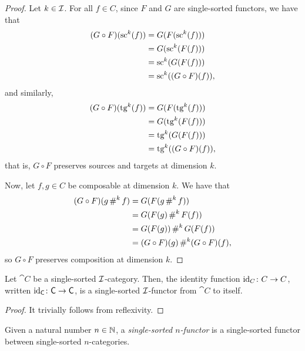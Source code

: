 \begin{proof}
  \leanok
  Let $k \in \mathcal{I}$. For all $f \in C$, since $F$ and $G$ are single-sorted functors, we have that
  \[
    \begin{split}
      (G \circ F) (\operatorname{sc}^k (f))
      & = G (F (\operatorname{sc}^k (f))) \\
      & = G (\operatorname{sc}^k (F (f))) \\
      & = \operatorname{sc}^k (G (F (f))) \\
      & = \operatorname{sc}^k ((G \circ F) (f)),
    \end{split}
  \]
  and similarly,
  \[
    \begin{split}
      (G \circ F) (\operatorname{tg}^k (f))
      & = G (F (\operatorname{tg}^k (f))) \\
      & = G (\operatorname{tg}^k (F (f))) \\
      & = \operatorname{tg}^k (G (F (f))) \\
      & = \operatorname{tg}^k ((G \circ F) (f)),
    \end{split}
  \]
  that is, $G \circ F$ preserves sources and targets at dimension $k$.

  Now, let $f, g \in C$ be composable at dimension $k$. We have that
  \[
    \begin{split}
      (G \circ F) (g \operatorname{\#}^k f)
      & = G (F (g \operatorname{\#}^k f)) \\
      & = G (F (g) \operatorname{\#}^k F (f)) \\
      & = G (F (g)) \operatorname{\#}^k G (F (f)) \\
      & = (G \circ F) (g) \operatorname{\#}^k (G \circ F) (f),
    \end{split}
  \]
  so $G \circ F$ preserves composition at dimension $k$.
\end{proof}

\begin{construction}
  \label{def:SingleSortedFunctor_id}
  \leanok
  Let $\cat{C}$ be a single-sorted $\mathcal{I}$-category. Then, the identity function $\operatorname{id}_C \colon C
  \to C$, written $\operatorname{id}_{\mathsf{C}} \colon \mathsf{C} \to \mathsf{C}$, is a single-sorted $\mathcal{I}$-functor
  from $\cat{C}$ to itself.
\end{construction}

\begin{proof}
  \leanok
  It trivially follows from reflexivity.
\end{proof}

\begin{definition}
  \label{def:SingleSortedNFunctor}
  \leanok
  Given a natural number $n \in \mathbb{N}$, a \emph{single-sorted $n$-functor} is a single-sorted
  functor between single-sorted $n$-categories.
\end{definition}

